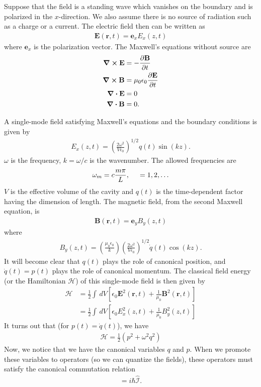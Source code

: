 \documentclass{book}
\theoremstyle{definition}
\newcommand{\p}{\partial}
\newcommand{\ham}{\mathcal{H}}
\newcommand{\f}[2]{\frac{#1}{#2}}
\newcommand{\lp}{\left(}
\newcommand{\rp}{\right)}
\newcommand{\lb}{\left[}
\newcommand{\rb}{\right]}
\newcommand{\Id}{\mathcal{I}}
\begin{document}
Suppose that the field is a standing wave which vanishes on the boundary and is polarized in the $x$-direction. We also assume there is no source of radiation such as a charge or a current. The electric field then can be written as
\begin{align}
\mathbf{E}(\mathbf{r},t) = \mathbf{e}_xE_x(z,t)
\end{align}
where $\mathbf{e}_x$ is the polarization vector. The Maxwell's equations without source are
\begin{align}
\curl{\mathbf{E}} &= -\f{\p \mathbf{B}}{\p t}\\
\curl{\mathbf{B}} &= \mu_0\epsilon_0\f{\p \mathbf{E}}{\p t}\\
\div{\mathbf{E}} &= 0\\
\div{\mathbf{B}} &= 0.
\end{align}

A single-mode field satisfying Maxwell’s equations and the boundary conditions is given by
\begin{align}
E_x(z,t) = \lp \f{2\omega^2}{V\epsilon_0} \rp^{1/2} q(t)\sin(kz).
\end{align}
$\omega$ is the frequency, $k = \omega/c$ is the wavenumber. The allowed frequencies are
\begin{align}
\omega_m = c\f{m \pi}{L},\hspace{0.5cm}  =1,2,\dots
\end{align} 
$V$ is the effective volume of the cavity and $q(t)$ is the time-dependent factor having the dimension of length. The magnetic field, from the second Maxwell equation, is
\begin{align}
\mathbf{B}(\mathbf{r},t) = \mathbf{e}_yB_y(z,t)
\end{align}
where
\begin{align}
B_y(z,t) = \lp \f{\mu_0\epsilon_0}{k} \rp\lp \f{2\omega^2}{V\epsilon_0} \rp^{1/2}\dot{q}(t)\cos(kz).
\end{align}
It will become clear that $q(t)$ plays the role of canonical position, and $\dot{q}(t) = p(t)$ plays the role of canonical momentum. The classical field energy (or the Hamiltonian $\ham$) of this single-mode field is then given by
\begin{align}
\ham &= \f{1}{2}\int\,dV \lb \epsilon_0 \mathbf{E}^2(\mathbf{r},t) + \f{1}{\mu_0}\mathbf{B}^2(\mathbf{r},t) \rb\\
&= \f{1}{2}\int\,dV \lb \epsilon_0 E^2_x(z,t) + \f{1}{\mu_0}B_y^2(z,t) \rb
\end{align}
It turns out that (for $p(t) = \dot{q}(t)$), we have
\begin{align}
\boxed{\ham = \f{1}{2}\lp p^2 + \omega^2q^2 \rp}
\end{align} 
Now, we notice that we have the canonical variables $q$ and $p$. When we promote these variables to operators (so we can quantize the fields), these operators must satisfy the canonical commutation relation
\begin{align}
[\hat{q}, \hat{p}] = i\hbar \hat{\Id}.
\end{align}
\end{document}
